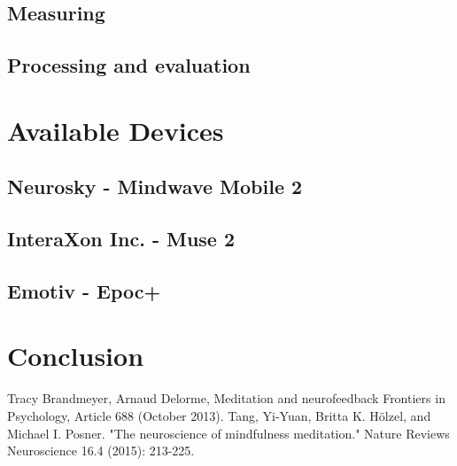 \documentclass{llncs} %
\begin{document}
\subsection{Measuring}
\subsection{Processing and evaluation}
\section{Available Devices}
\subsection{Neurosky - Mindwave Mobile 2}
\subsection{InteraXon Inc. - Muse 2}
\subsection{Emotiv - Epoc+}
\section{Conclusion}


\begin{thebibliography}{[MT1]}
    Tracy Brandmeyer, Arnaud Delorme,
    Meditation and neurofeedback
    Frontiers in Psychology, Article 688 (October 2013).
    Tang, Yi-Yuan, Britta K. Hölzel, and Michael I. Posner. "The neuroscience of mindfulness meditation." Nature Reviews Neuroscience 16.4 (2015): 213-225.
    \end{thebibliography}
\end{document}
